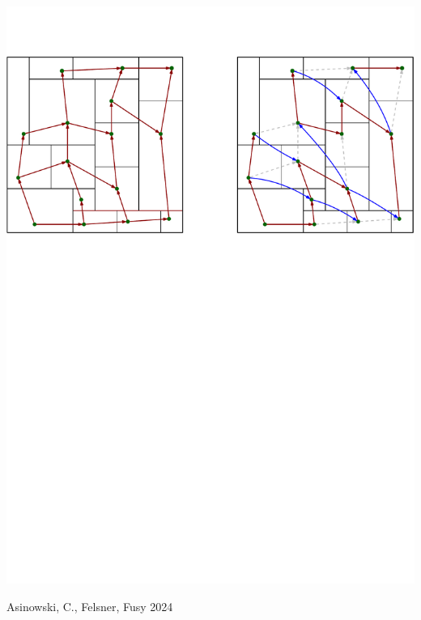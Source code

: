 \documentclass[11pt]{beamer}%
\newcommand{\green}{\color{darkgreen}}
\newcommand{\auth}[1]{{\green\hfill{\footnotesize #1}}}
\begin{document}
\begin{frame}
\begin{center}
    \includegraphics[height=.5\textheight]{s_poset_rect_v1.pdf}
  \end{center}
      \auth{Asinowski, C., Felsner, Fusy 2024}

\end{frame}
\end{document}
